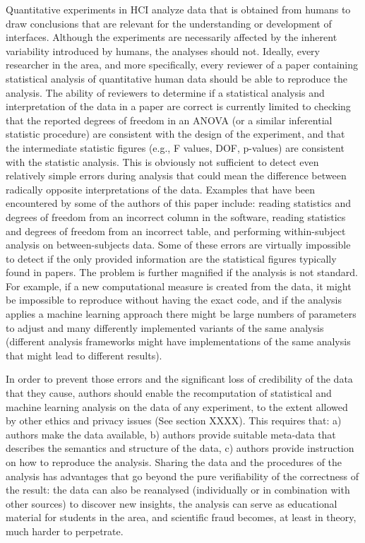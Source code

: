Quantitative experiments in HCI analyze data that is obtained from humans to draw conclusions that are relevant for the understanding or development of interfaces. Although the experiments are necessarily affected by the inherent variability introduced by humans, the analyses should not. Ideally, every researcher in the area, and more specifically, every reviewer of a paper containing statistical analysis of quantitative human data should be able to reproduce the analysis. The ability of reviewers to determine if a statistical analysis and interpretation of the data in a paper are correct is currently limited to checking that the reported degrees of freedom in an ANOVA (or a similar inferential statistic procedure) are consistent with the design of the experiment, and that the intermediate statistic figures (e.g., F values, DOF, p-values) are consistent with the statistic analysis. This is obviously not sufficient to detect even relatively simple errors during analysis that could mean the difference between radically opposite interpretations of the data. Examples that have been encountered by some of the authors of this paper include: reading statistics and degrees of freedom from an incorrect column in the software, reading statistics and degrees of freedom from an incorrect table, and performing within-subject analysis on between-subjects data. Some of these errors are virtually impossible to detect if the only provided information are the statistical figures typically found in papers. The problem is further magnified if the analysis is not standard. For example, if a new computational measure is created from the data, it might be impossible to reproduce without having the exact code, and if the analysis applies a machine learning approach there might be large numbers of parameters to adjust and many differently implemented variants of the same analysis (different analysis frameworks might have implementations of the same analysis that might lead to different results).

In order to prevent those errors and the significant loss of credibility of the data that they cause, authors should enable the recomputation of statistical and machine learning analysis on the data of any experiment, to the extent allowed by other ethics and privacy issues (See section XXXX). This requires that: a) authors make the data available, b) authors provide suitable meta-data that describes the semantics and structure of the data, c) authors provide instruction on how to reproduce the analysis. Sharing the data and the procedures of the analysis has advantages that go beyond the pure verifiability of the correctness of the result: the data can also be reanalysed (individually or in combination with other sources) to discover new insights, the analysis can serve as educational material for students in the area, and scientific fraud becomes, at least in theory, much harder to perpetrate. 

